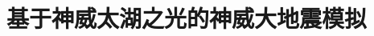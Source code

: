 \documentclass[degree=doctor]{thuthesis}
\begin{document}
\section{基于神威太湖之光的神威大地震模拟}


%
%


\backmatter

\listoffigures
\listoftables
\listofequations



% 





\begin{appendix}

\end{appendix}




\end{document}
